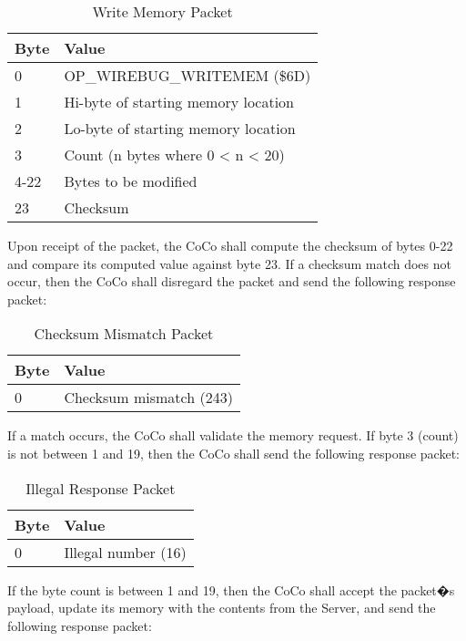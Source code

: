 \documentclass{article}
\begin{document}
\begin{table}[ht]
\caption{Write Memory Packet}
\begin{center}
\begin{tabular}{|ll|}
\hline
Byte & Value \\ \hline
0 & OP\_WIREBUG\_WRITEMEM (\$6D) \\
1 & Hi-byte of starting memory location \\
2 & Lo-byte of starting memory location \\
3 & Count (n bytes where 0 < n < 20) \\
4-22 & Bytes to be modified \\
23 & Checksum \\
\hline
\end{tabular}
\end{center}
\end{table}

Upon receipt of the packet, the CoCo shall compute the checksum of bytes 0-22 and compare its computed value against byte 23. If a checksum match does not occur, then the CoCo shall disregard the packet and send the following response packet:

\begin{table}[ht]
\caption{Checksum Mismatch Packet}
\begin{center}
\begin{tabular}{|ll|}
\hline
Byte & Value \\ \hline
0 & Checksum mismatch (243) \\
\hline
\end{tabular}
\end{center}
\end{table}

If a match occurs, the CoCo shall validate the memory request. If byte 3 (count) is not between 1 and 19, then the CoCo shall send the following response packet:

\begin{table}[ht]
\caption{Illegal Response Packet}
\begin{center}
\begin{tabular}{|ll|}
\hline
Byte & Value \\ \hline
0 & Illegal number (16) \\
\hline
\end{tabular}
\end{center}
\end{table}

If the byte count is between 1 and 19, then the CoCo shall accept the packet�s payload, update its memory with the contents from the Server, and send the following response packet:
\end{document}
